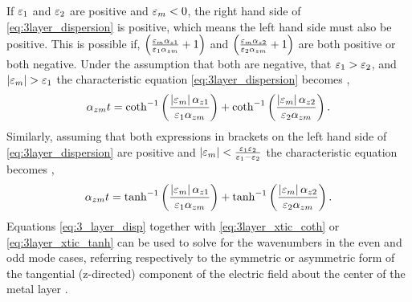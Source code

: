 \documentclass[11pt]{article}
\begin{document}
If $\varepsilon_1$ and $\varepsilon_2$ are positive and $\varepsilon_m < 0$, the right hand side of \eqref{eq:3layer_dispersion} is positive, which means the left hand side must also be positive. This is possible if,
$\left( \frac{\varepsilon_m \alpha_{z1}}{\varepsilon_1 \alpha_{zm}} + 1 \right)$ and
$\left( \frac{\varepsilon_m \alpha_{z2}}{\varepsilon_2 \alpha_{zm}} + 1 \right)$ are both positive or both negative. Under the assumption that both are negative, that
$ \varepsilon_1 > \varepsilon_2 $, and $\left| \varepsilon_m \right| > \varepsilon_1$  the characteristic equation \eqref{eq:3layer_dispersion} becomes \cite{Durach_2007},
%
\begin{equation}
  \alpha_{zm}t = \coth ^{-1} \left( \frac{\left| \varepsilon_m \right|\alpha_{z1}}{\varepsilon_1 \alpha_{zm}} \right) + \coth ^{-1} \left( \frac{\left| \varepsilon_m \right|\alpha_{z2}}{\varepsilon_2 \alpha_{zm}} \right).
  \label{eq:3layer_xtic_coth}
\end{equation}
%
Similarly, assuming that both expressions in brackets on the left hand side of \eqref{eq:3layer_dispersion} are positive and
$\left| \varepsilon_m  \right| < \frac{\varepsilon_1 \varepsilon_2}{\varepsilon_1 - \varepsilon_2}$  the characteristic equation becomes \cite{Durach_2007},
%
\begin{equation}
  \alpha_{zm} t = \tanh^{-1} \left( \frac{\left| \varepsilon_m \right| \alpha_{z1}}{\varepsilon_1 \alpha_{zm}} \right) + \tanh^{-1} \left( \frac{\left| \varepsilon_m \right| \alpha_{z2}}{\varepsilon_2 \alpha_{zm}} \right).
  \label{eq:3layer_xtic_tanh}
\end{equation}
%
Equations \eqref{eq:3_layer_disp} together with \eqref{eq:3layer_xtic_coth} or \eqref{eq:3layer_xtic_tanh} can be used to solve for the wavenumbers in the even and odd mode cases, referring respectively to the symmetric or asymmetric form of the tangential (z-directed) component of the electric field about the center of the metal layer \cite{Burke1986}.
\end{document}
